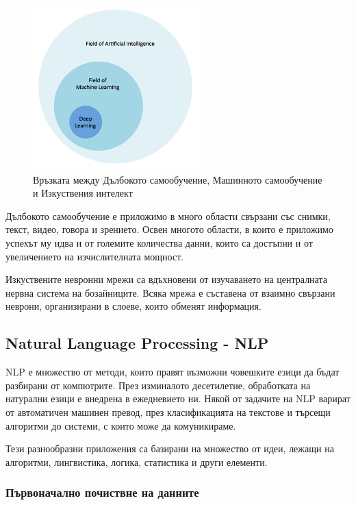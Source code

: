 \documentclass{article}
\begin{document}
    \begin{figure}[H]
        \centering
        \captionsetup{justification=centering}
        \includegraphics{chapter-03/deep-learning.png}
        \caption{Връзката между Дълбокото самообучение, Машинното самообучение и Изкуствения интелект}
    \end{figure}

    Дълбокото самообучение е приложимо в много области свързани със снимки, текст, видео, говора и зрението. Освен многото
    области, в които е приложимо успехът му идва и от големите количества данни, които са достъпни и от увеличението на
    изчислителната мощност.

    Изкуствените невронни мрежи са вдъхновени от изучаването на централната нервна система на бозайниците. Всяка мрежа е
    съставена от взаимно свързани неврони, организирани в слоеве, които обменят информация. \cite{deep-learning-keras}

    \subsection{Natural Language Processing - NLP}

    NLP е множество от методи, които правят възможни човешките езици да бъдат разбирани от компютрите. През изминалото
    десетилетие, обработката на натурални езици е внедрена в ежедневието ни. Някой от задачите на NLP варират от
    автоматичен машинен превод, през класификацията на текстове и търсещи алгоритми до системи, с които може да
    комуникираме.

    Тези разнообразни приложения са базирани на множество от идеи, лежащи на алгоритми, лингвистика, логика, статистика и
    други елементи. \cite{intro-to-nlp-mit}

    \subsubsection{Първоначално почиствне на данните}
\end{document}
